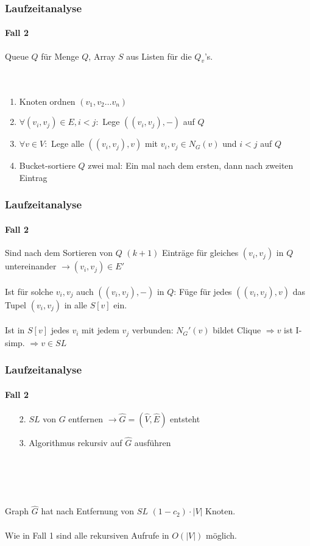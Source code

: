 \begin{frame}
\frametitle{Laufzeitanalyse}
\framesubtitle{Fall 2}

Queue $Q$ für Menge $Q$, Array $S$ aus Listen für die $Q_v$'s. \\
\ \\
\ \\

\begin{enumerate}
	\item Knoten ordnen $(v_1, v_2 \dots v_n)$
	\item $\forall (v_i, v_j) \in E, i < j:$ Lege $((v_i, v_j), -)$ auf $Q$
	\item $\forall v \in V:$ Lege alle $((v_i, v_j), v)$ mit $v_i, v_j \in N_G(v)$ und $i < j$ auf $Q$
	\item Bucket-sortiere $Q$ zwei mal: Ein mal nach dem ersten, dann nach zweiten Eintrag
\end{enumerate}


\end{frame}


\begin{frame}
\frametitle{Laufzeitanalyse}
\framesubtitle{Fall 2}

Sind nach dem Sortieren von $Q$ $(k+1)$ Einträge für gleiches $(v_i, v_j)$ in $Q$ untereinander $\rightarrow (v_i, v_j) \in E'$ \\
\ \\
Ist für solche $v_i, v_j$ auch $((v_i, v_j), -)$ in $Q$: Füge für jedes $((v_i, v_j), v)$ das Tupel $(v_i, v_j)$ in alle $S[v]$ ein.\\
\ \\
Ist in $S[v]$ jedes $v_i$ mit jedem $v_j$ verbunden: $N_G'(v)$ bildet Clique $\Rightarrow v$ ist I-simp. $\Rightarrow v \in SL$
\end{frame}


\begin{frame}
\frametitle{Laufzeitanalyse}
\framesubtitle{Fall 2}

\begin{enumerate}
	\item[2.] $SL$ von $G$ entfernen $\rightarrow \widehat{G}=(\widehat{V}, \widehat{E})$ entsteht %
	\item[3.] Algorithmus rekursiv auf $\widehat{G}$ ausführen
\end{enumerate}
\ \\
\ \\
\ \\
\ \\
Graph $\widehat{G}$ hat nach Entfernung von $SL$ $(1 - c_2) \cdot |V|$ Knoten. \\
\ \\
Wie in Fall 1 sind alle rekursiven Aufrufe in $O(|V|)$ möglich. \\

\end{frame}


